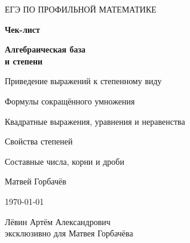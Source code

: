 \documentclass[a4paper,12pt]{article}
\begin{document}

\begin{titlepage}
\thispagestyle{empty}

\begin{center}

\vspace*{2.2cm}

{\small\color{softgray}
ЕГЭ ПО ПРОФИЛЬНОЙ МАТЕМАТИКЕ
}

\vspace{1.3cm}

{\Huge\bfseries\color{darkaccent}
Чек-лист
}

\vspace{0.8cm}

{\LARGE\bfseries
Алгебраическая база\\[0.25em]
и степени
}

\vspace{0.55cm}

{\Large\color{accent}
Приведение выражений к степенному виду
}

\vspace{1.5cm}

{\large
Формулы сокращённого умножения
}

\vspace{0.3cm}

{\large
Квадратные выражения, уравнения и неравенства
}

\vspace{0.3cm}

{\large
Свойства степеней
}

\vspace{0.3cm}

{\large
Составные числа, корни и дроби
}

\vfill

{\large
Матвей Горбачёв
}

\vspace{0.8cm}

{\normalsize
\today
}

\vspace{1.0cm}

{\small
Лёвин Артём Александрович\\
эксклюзивно для Матвея Горбачёва
}

\vspace{1.4cm}


\end{center}

\end{titlepage}
\end{document}
